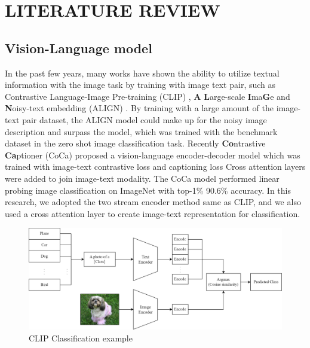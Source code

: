 \chapter{LITERATURE REVIEW}

\section{Vision-Language model}
In the past few years, many works have shown the ability to utilize textual information with the image task by training with image text pair, such as Contrastive Language-Image Pre-training (CLIP) , \textbf{A} \textbf{L}arge-scale \textbf{I}ma\textbf{G}e and \textbf{N}oisy-text embedding (ALIGN) .
By training with a large amount of the image-text pair dataset, the ALIGN model could make up for the noisy image description and surpass the model, which was trained with the benchmark dataset in the zero shot image classification task.
Recently \textbf{Co}ntrastive \textbf{Ca}ptioner (CoCa)  proposed a vision-language encoder-decoder model which was trained with image-text contrastive loss and captioning loss
Cross attention layers were added to join image-text modality.
The CoCa model performed linear probing image classification on ImageNet with top-1\% 90.6\% accuracy.
In this research, we adopted the two stream encoder method same as CLIP, and we also used a cross attention layer to create image-text representation for classification.

\begin{figure}[h]
    \caption{CLIP Classification example}
    \label{fig:clip_classification}
    \centering
    \includegraphics[width=1\textwidth]{Images/CLIPClassification.png}
    \small
\end{figure}

